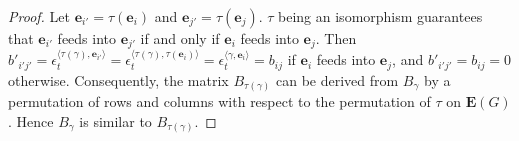 \documentclass[10pt,a4paper]{amsart}
\newcommand{\vE}{{\mathbf E}}
\newcommand{\ve}{{\mathbf e}}
\begin{document}
\begin{proof}
Let $\ve_{i'}=\tau(\ve_i)$ and $\ve_{j'}=\tau(\ve_j)$. $\tau$ being an isomorphism guarantees that $\ve_{i'}$ feeds into $\ve_{j'}$ if and only if $\ve_i$ feeds into $\ve_j$. Then $b'_{i'j'}=\epsilon_t^{\langle\tau(\gamma),\ve_{i'}\rangle}=\epsilon_t^{\langle\tau(\gamma),\tau(\ve_{i})\rangle} = \epsilon_t^{\langle\gamma,\ve_i\rangle}=b_{ij}$ if $\ve_i$ feeds into $\ve_j$, and $b'_{i'j'}=b_{ij}=0$ otherwise. Consequently, the matrix $B_{\tau(\gamma)}$ can be derived from $B_\gamma$ by a permutation of rows and columns with respect to the permutation of $\tau$ on $\vE(G)$. Hence $B_\gamma$ is similar to $B_{\tau(\gamma)}$. 
\end{proof}
\end{document}
